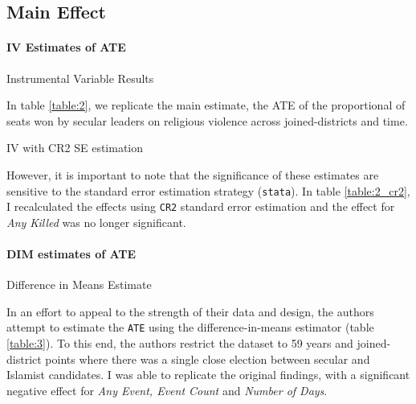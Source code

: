 \documentclass{scrartcl}
\begin{document}
\subsection{Main Effect}

\paragraph{IV Estimates of ATE} \label{ate:iv}

\begin{table}[ht]
  \begin{center}
    \scalebox{0.75}{
      
    }
    \caption{Instrumental Variable Results}
    \label{table:2}
  \end{center}
\end{table}

In table \ref{table:2}, we replicate the main estimate, the ATE of the proportional of seats won by secular leaders on religious violence across joined-districts and time. 

\begin{table}[ht]
  \begin{center}
    \scalebox{0.75}{
      
    }
    \caption{IV with CR2 SE estimation}
    \label{table:2_cr2}
  \end{center}
\end{table}

However, it is important to note that the significance of these estimates are sensitive to the standard error estimation strategy (\texttt{stata}).
In table \ref{table:2_cr2}, I recalculated the effects using \texttt{CR2} standard error estimation and the effect for \textit{Any Killed} was no longer significant.

\paragraph{DIM estimates of ATE}

\begin{table}[ht]
  \begin{center}
    \scalebox{0.75}{
      
    }
    \caption{Difference in Means Estimate}
    \label{table:3}
  \end{center}
\end{table}

In an effort to appeal to the strength of their data and design, the authors attempt to estimate the \texttt{ATE} using the difference-in-means estimator (table \ref{table:3}).
To this end, the authors restrict the dataset to 59 years and joined-district points where there was a single close election between secular and Islamist candidates. I was able to replicate the original findings, with a significant negative effect for \textit{Any Event, Event Count} and \textit{Number of Days}.
\end{document}
